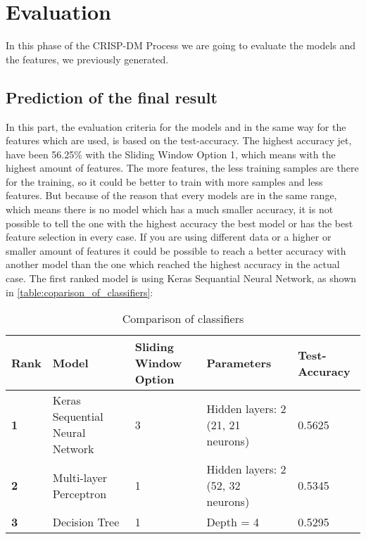 
\chapter{Evaluation}
In this phase of the CRISP-DM Process we are going to evaluate the models and the features, we previously generated.\newline

\section{Prediction of the final result}
In this part, the evaluation criteria for the models and in the same way for the features which are used, is based on the test-accuracy. The highest accuracy jet, have been 56.25\% with the Sliding Window Option 1, which means with the highest amount of features. The more features, the less training samples are there for the training, so it could be better to train with more samples and less features. But because of the reason that every models are in the same range, which means there is no model which has a much smaller accuracy, it is not possible to tell the one with the highest accuracy the best model or has the best feature selection in every case. If you are using different data or a higher or smaller amount of features it could be possible to reach a better accuracy with another model than the one which reached the highest accuracy in the actual case. The first ranked model is using Keras Sequantial Neural Network, as shown in \autoref{table:coparison_of_classifiers}:

\begin{table}[H]
\centering
\begin{tabular}{|p{2.5cm}|p{2.5cm}|p{2.5cm}|p{2.5cm}|p{2.5cm}|}
\hline

\textbf{Rank} & \textbf{Model} & \textbf{Sliding Window Option} & \textbf{Parameters} & \textbf{Test-Accuracy} \\ \hline
\textbf{1} & Keras Sequential Neural Network & 3 & Hidden layers: 2 (21, 21 neurons) & 0.5625 \\ \hline
\textbf{2} & Multi-layer Perceptron & 1 & Hidden layers: 2 (52, 32 neurons) & 0.5345 \\ \hline
\textbf{3} & Decision Tree & 1 & Depth = 4 & 0.5295 \\ \hline

\end{tabular}
\caption{Comparison of classifiers}
\label{table:coparison_of_classifiers}
\end{table}

